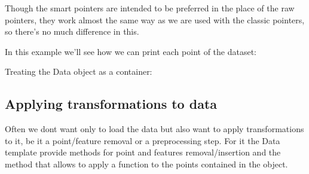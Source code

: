 \documentclass[letterpaper,10pt,english]{sphinxmanual}
\begin{document}
\sphinxAtStartPar
Though the smart pointers are intended to be preferred in the place of the raw pointers, they work almost the same way as we are used with the classic pointers, so there’s no much difference in this.

\sphinxAtStartPar
In this example we’ll see how we can print each point of the dataset:

\begin{sphinxVerbatim}[commandchars=\\\{\}]
        

      
        
\end{sphinxVerbatim}

\sphinxAtStartPar
Treating the Data object as a container:

\begin{sphinxVerbatim}[commandchars=\\\{\}]
      
          
          \PYG{p}{[}\PYG{p}{]}  
\end{sphinxVerbatim}


\subsection{Applying transformations to data}
\label{\detokenize{getting_started/datamanagement:applying-transformations-to-data}}
\sphinxAtStartPar
Often we dont want only to load the data but also want to apply transformations to it, be it a point/feature removal or a preprocessing step.
For it the Data template provide methods for point and features removal/insertion and the method  that allows to apply a function to
the points contained in the object.
\end{document}
